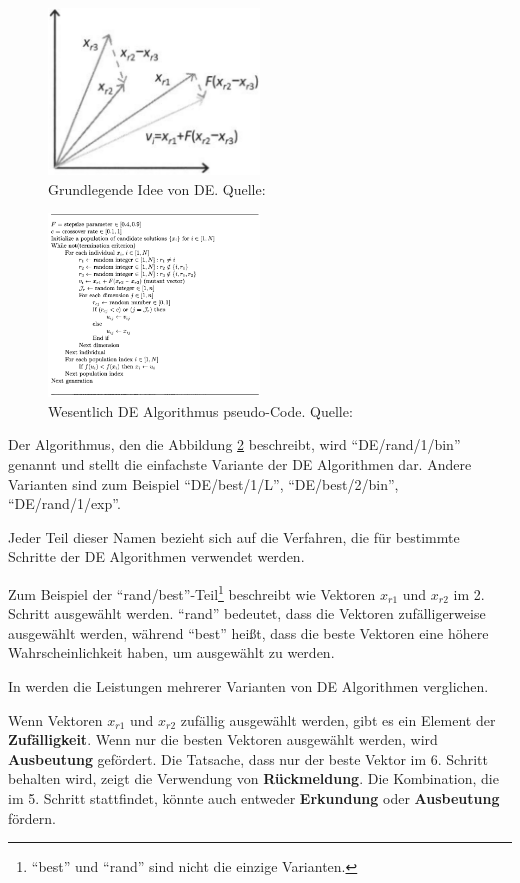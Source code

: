 \documentclass[twoside,twocolumn]{article}
\begin{document}
\begin{figure}
\caption{Grundlegende Idee von DE. Quelle: \cite{wiley_evolutionary}}
\label{fig:de_beispiel}
\centering
\includegraphics[width=0.5\textwidth]{images/de_beispiel.png}
\end{figure}

\begin{figure}
\caption{Wesentlich DE Algorithmus pseudo-Code. Quelle: \cite{wiley_evolutionary}}
\label{fig:de_pseudo}
\centering
\includegraphics[width=0.5\textwidth]{images/de_pseudo.png}
\end{figure}

Der Algorithmus, den die Abbildung \ref{fig:de_pseudo} beschreibt, wird \enquote{DE/rand/1/bin} genannt und stellt die einfachste Variante der DE Algorithmen dar. Andere Varianten sind zum Beispiel \enquote{DE/best/1/L}, \enquote{DE/best/2/bin}, \enquote{DE/rand/1/exp}.\par
Jeder Teil dieser Namen bezieht sich auf die Verfahren, die für bestimmte Schritte der DE Algorithmen verwendet werden.\par
Zum Beispiel der \enquote{rand/best}-Teil\footnote{\enquote{best} und \enquote{rand} sind nicht die einzige Varianten.} beschreibt wie Vektoren $x_{r1}$ und $x_{r2}$ im 2. Schritt ausgewählt werden. \enquote{rand} bedeutet, dass die Vektoren zufälligerweise ausgewählt werden, während \enquote{best} heißt, dass die beste Vektoren eine höhere Wahrscheinlichkeit haben, um ausgewählt zu werden.\par
In \cite{love_u_mex} werden die Leistungen mehrerer Varianten von DE Algorithmen verglichen.\par
Wenn Vektoren $x_{r1}$ und $x_{r2}$ zufällig ausgewählt werden, gibt es ein Element der \textbf{Zufälligkeit}. Wenn nur die besten Vektoren ausgewählt werden, wird \textbf{Ausbeutung} gefördert. Die Tatsache, dass nur der beste Vektor im 6. Schritt behalten wird, zeigt die Verwendung von \textbf{Rückmeldung}. Die Kombination, die im 5. Schritt stattfindet, könnte auch entweder \textbf{Erkundung} oder \textbf{Ausbeutung} fördern.
\end{document}

